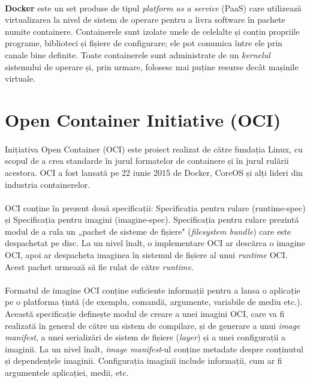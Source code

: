         \paragraph{} \textbf{Docker} este un set produse de tipul \textit{platform as a service} (PaaS) care utilizează virtualizarea la nivel de sistem de operare pentru a livra software în pachete numite containere. Containerele sunt izolate unele de celelalte și conțin propriile programe, biblioteci și fișiere de configurare; ele pot comunica între ele prin canale bine definite. Toate containerele sunt administrate de un \textit{kernelul} sistemului de operare și, prin urmare, folosesc mai puține resurse decât mașinile virtuale. \cite{wiki:docker}

\section{Open Container Initiative (OCI)}
    \paragraph{} Inițiativa Open Container (OCI) este proiect realizat de către fundația Linux, cu scopul de a crea standarde în jurul formatelor de containere și în jurul rulării acestora. OCI a fost lansată pe 22 iunie 2015 de Docker, CoreOS și alți lideri din industria containerelor.
    \paragraph{} OCI conține în prezent două specificații: Specificația pentru rulare (runtime-spec) și Specificația pentru imagini (imagine-spec). Specificația pentru rulare prezintă modul de a rula un „pachet de sisteme de fișiere" (\textit{filesystem bundle}) care este despachetat pe disc. La un nivel înalt, o implementare OCI ar descărca o imagine OCI, apoi ar despacheta imaginea în sistemul de fișiere al unui \textit{runtime} OCI. Acest pachet urmează să fie rulat de către \textit{runtime}.
    \paragraph{} Formatul de imagine OCI conține suficiente informații pentru a lansa o aplicație pe o platforma țintă (de exemplu, comandă, argumente, variabile de mediu etc.). Această specificație definește modul de creare a unei imagini OCI, care va fi realizată în general de către un sistem de compilare, și de generare a unui \textit{image manifest}, a unei serializări de sistem de fișiere (\textit{layer}) și a unei configurații a imaginii. La un nivel înalt, \textit{image manifest}-ul conține metadate despre conținutul și dependențele imaginii. Configurația imaginii include informații, cum ar fi argumentele aplicației, medii, etc.

